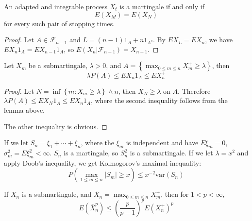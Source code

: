 \begin{corollary}
    An adapted and integrable process $X_t$ is a martingale if and only if 
    \[E(X_M)=E(X_N)\] 
    for every such pair of stopping times.
\end{corollary}
\begin{proof}
    Let $A\in\mathcal{F}_{n-1}$ and $L=(n-1)1_A+n1_{A^c}$. By $EX_L=EX_n$, we have $EX_n1_A=EX_{n-1}1_A$,
    so $E(X_n|\mathcal{F}_{n-1})=X_{n-1}$.
\end{proof}


\begin{theorem}
Let $X_m$ be a submartingale, $\lambda>0$, and $A=\left\{ \max_{0\le m\le n}X_m^+  \geq\lambda\right\}$, then \[\lambda P(A)\le EX_n1_A\le EX_n^+\]
\end{theorem}
\begin{proof}
Let $N=\inf\left\{m:X_m\geq\lambda\right\}\wedge n$, then $X_N\geq\lambda$ on $A$. Therefore $\lambda P(A)\le EX_N1_A\le EX_n1_A$, where the second inequality follows from the lemma above.\par
The other inequality is obvious.
\end{proof}
\begin{example}
If we let $S_n=\xi_1+\cdots+\xi_n$, where the $\xi_m$ is independent and have $E\xi_m=0$, $\sigma_m^2=E\xi_m^2<\infty$. $S_n$ is a martingale, so $S_n^2$ is a submartingale. If we let $\lambda=x^2$ and apply Doob's inequality, we get Kolmogorov's maximal inequality: \[P(\max_{1\le m\le n}\left|S_m\right|\geq x)\le x^{-2}\text{var}(S_n)\]
\end{example}
\begin{theorem}
If $X_n$ is a submartingale, and $\bar{X}_n= \max_{0\le m\le n}X_m^+$, then for $1<p<\infty$, \[E(\bar{X}_n^p)\le (\frac{p}{p-1})^pE(X_n^+)^p\]
\end{theorem}
